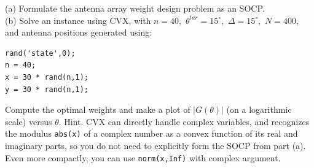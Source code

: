 \documentclass{article}
\begin{document}
(a) Formulate the antenna array weight design problem as an SOCP.\\

(b) Solve an instance using CVX, with $n = 40,$ $
\theta^{tar} = 15^{\circ},$ $\Delta = 15^{\circ},$ $N = 400,$ 
and antenna positions generated using:

\begin{verbatim}
rand('state',0);
n = 40;
x = 30 * rand(n,1);
y = 30 * rand(n,1);
\end{verbatim}

Compute the optimal weights and make a plot of $|G(\theta)|$ (on a logarithmic scale) versus $\theta.$ Hint. CVX can directly handle complex variables, and recognizes the modulus \verb|abs(x)| of a
complex number as a convex function of its real and imaginary parts, so you do not need to
explicitly form the SOCP from part (a). Even more compactly, you can use \verb|norm(x,Inf)| with complex argument.
\end{document}
